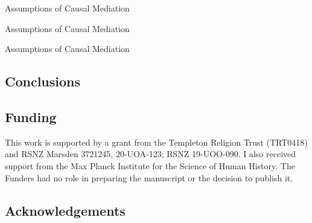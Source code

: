 \documentclass[
  single column]{article}
\begin{document}
\newpage{}

\begin{table}

\caption{\label{tbl-medationassumptions}Assumptions of Causal Mediation}

\centering{

\mediationassumptionsswig

}

\end{table}%

\newpage{}

\begin{table}

\caption{\label{tbl-pearltable}Assumptions of Causal Mediation}

\centering{

\pearltable

}

\end{table}%

\newpage{}

\begin{table}

\caption{\label{tbl-swigtabledeveloped}Assumptions of Causal Mediation}

\centering{

\swigtabledeveloped

}

\end{table}%

\subsection{Conclusions}\label{conclusions}

\subsection{Funding}\label{funding}

This work is supported by a grant from the Templeton Religion Trust
(TRT0418) and RSNZ Marsden 3721245, 20-UOA-123; RSNZ 19-UOO-090. I also
received support from the Max Planck Institute for the Science of Human
History. The Funders had no role in preparing the manuscript or the
decision to publish it.

\subsection{Acknowledgements}\label{acknowledgements}
\end{document}

